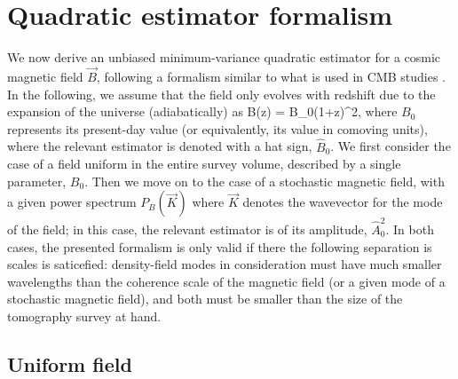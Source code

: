 \section{Quadratic estimator formalism}
\label{sec:estimators}

We now derive an unbiased minimum-variance quadratic estimator for a cosmic magnetic field $\vec B$, following a formalism similar to what is used in CMB studies \cite{2003PhRvD..67h3002O}. In the following, we assume that the field only evolves with redshift due to the expansion of the universe (adiabatically) as 
\beq
B(z) = B_0(1+z)^2,
\label{eq:B0}
\eeq
where $B_0$ represents its present-day value (or equivalently, its value in comoving units), where the relevant estimator is denoted with a hat sign, $\widehat B_0$. We first consider the case of a field uniform in the entire survey volume, described by a single parameter, $B_0$. Then we move on to the case of a stochastic magnetic field, with a given power spectrum $P_B(\vec K)$ where $\vec K$ denotes the wavevector for the mode of the field; in this case, the relevant estimator is of its amplitude, $\widehat A_0^2$. In both cases, the presented formalism is only valid if there the following separation is scales is saticefied: density-field modes in consideration must have much smaller wavelengths than the coherence scale of the magnetic field (or a given mode of a stochastic magnetic field), and both must be smaller than the size of the tomography survey at hand.

\subsection{Uniform field}
\label{subsec:uniform}

